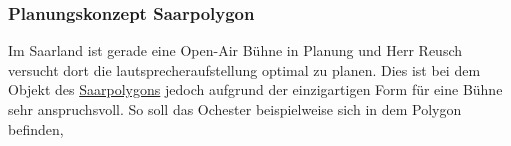 \subsubsection{Planungskonzept Saarpolygon}
Im Saarland ist gerade eine Open-Air Bühne in Planung und Herr Reusch versucht dort die lautsprecheraufstellung optimal zu planen. Dies ist bei dem Objekt des \href{www.Opernfestspiele-saarpolygon.de}{Saarpolygons} jedoch aufgrund der einzigartigen Form für eine Bühne sehr anspruchsvoll. So soll das Ochester beispielweise sich in dem Polygon befinden,